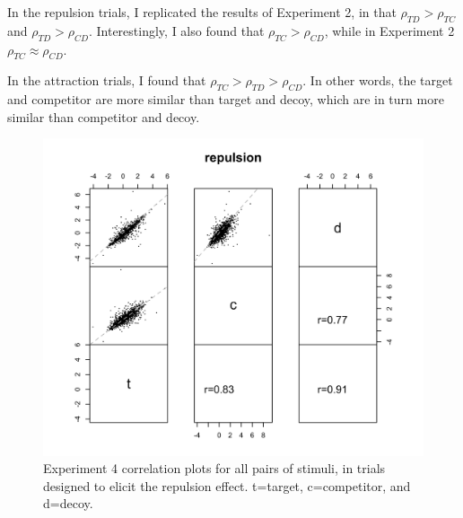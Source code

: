 In the repulsion trials, I replicated the results of Experiment 2, in that $\rho_{TD}>\rho_{TC}$ and $\rho_{TD}>\rho_{CD}$. Interestingly, I also found that $\rho_{TC}>\rho_{CD}$, while in Experiment 2 $\rho_{TC}\approx\rho_{CD}$.

In the attraction trials, I found that $\rho_{TC}>\rho_{TD}>\rho_{CD}$. In other words, the target and competitor are more similar than target and decoy, which are in turn more similar than competitor and decoy. 

\begin{figure}
    \includegraphics{figures/price_z_corplot_repulsion.jpeg}
    \caption{Experiment 4 correlation plots for all pairs of stimuli, in trials designed to elicit the repulsion effect. t=target, c=competitor, and d=decoy.}
    \label{fig:price_z_corplot_repulsion}
\end{figure}

